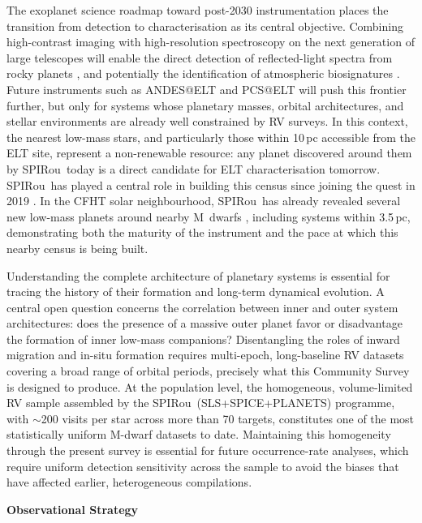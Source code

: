 \documentclass[
    traditabstract,
    longauth,
    onecolumn,
]{aa}
\def \spi{SPIRou}
\begin{document}
The exoplanet science roadmap toward post-2030 instrumentation places the transition from detection to characterisation as its central objective.
Combining high-contrast imaging with high-resolution spectroscopy on the next generation of large telescopes will enable the direct detection of reflected-light spectra from rocky planets \citep{snellen_combining_2015}, and potentially the identification of atmospheric biosignatures \citep{marconi2020}. 
Future instruments such as ANDES@ELT and PCS@ELT \citep{Kasper_pcs_2021} will push this frontier further, but only for systems whose planetary masses, orbital architectures, and stellar environments are already well constrained by RV surveys.
In this context, the nearest low-mass stars, and particularly those within 10\,pc accessible from the ELT site, represent a non-renewable resource: any planet discovered around them by \spi\ today is a direct candidate for ELT characterisation tomorrow.
\spi\ has played a central role in building this census since joining the quest in 2019 \citep{Donati2020b}.
In the CFHT solar neighbourhood, \spi\ has already revealed several new low-mass planets around nearby M~dwarfs \citep{moutou2024, cortes2025, carmona2025, ouldelhkim2026, charpentier2026}, including systems within 3.5\,pc, demonstrating both the maturity of the instrument and the pace at which this nearby census is being built.

Understanding the complete architecture of planetary systems is essential for tracing the history of their formation and long-term dynamical evolution.
A central open question concerns the correlation between inner and outer system architectures: does the presence of a massive outer planet favor or disadvantage the formation of inner low-mass companions? 
Disentangling the roles of inward migration \citep{alibert2006} and in-situ formation \citep{chiang2013} requires multi-epoch, long-baseline RV datasets covering a broad range of orbital periods, precisely what this Community Survey is designed to produce.
At the population level, the homogeneous, volume-limited RV sample assembled by the \spi\ (SLS+SPICE+PLANETS) programme, with $\sim$200 visits per star across more than 70 targets, constitutes one of the most statistically uniform M-dwarf datasets to date. 
Maintaining this homogeneity through the present survey is essential for future occurrence-rate analyses, which require uniform detection sensitivity across the sample to avoid the biases that have affected earlier, heterogeneous compilations.


\textbf{Observational Strategy}
\end{document}
